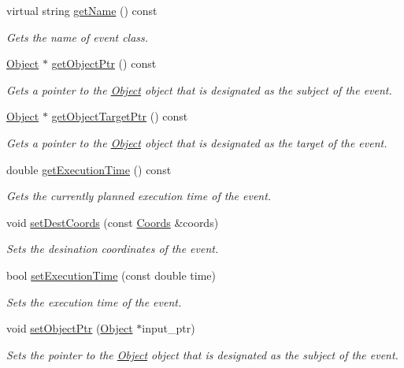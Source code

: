 \begin{DoxyCompactItemize}
virtual string \hyperlink{class_event_a8c38a406d844d05eac1ef007bad2487f}{get\+Name} () const
\begin{DoxyCompactList}\small\item\em Gets the name of event class. \end{DoxyCompactList}\item 
\hyperlink{class_object}{Object} $\ast$ \hyperlink{class_event_a5317d42bb07d0e75bec0c13bd9bf6de8}{get\+Object\+Ptr} () const
\begin{DoxyCompactList}\small\item\em Gets a pointer to the \hyperlink{class_object}{Object} object that is designated as the subject of the event. \end{DoxyCompactList}\item 
\hyperlink{class_object}{Object} $\ast$ \hyperlink{class_event_ab86f724c3c894faa1d6ccca78c357d24}{get\+Object\+Target\+Ptr} () const
\begin{DoxyCompactList}\small\item\em Gets a pointer to the \hyperlink{class_object}{Object} object that is designated as the target of the event. \end{DoxyCompactList}\item 
double \hyperlink{class_event_a65550d982cdf85d993658cd7070c960c}{get\+Execution\+Time} () const
\begin{DoxyCompactList}\small\item\em Gets the currently planned execution time of the event. \end{DoxyCompactList}\item 
void \hyperlink{class_event_a166ae40f2bf26c1e08097697ca76c884}{set\+Dest\+Coords} (const \hyperlink{struct_coords}{Coords} \&coords)
\begin{DoxyCompactList}\small\item\em Sets the desination coordinates of the event. \end{DoxyCompactList}\item 
bool \hyperlink{class_event_af4282af20bd5b3940ba75c23e6032f18}{set\+Execution\+Time} (const double time)
\begin{DoxyCompactList}\small\item\em Sets the execution time of the event. \end{DoxyCompactList}\item 
void \hyperlink{class_event_a078cadde679fc042486ef065a097c7af}{set\+Object\+Ptr} (\hyperlink{class_object}{Object} $\ast$input\+\_\+ptr)
\begin{DoxyCompactList}\small\item\em Sets the pointer to the \hyperlink{class_object}{Object} object that is designated as the subject of the event. \end{DoxyCompactList}\item 

\end{DoxyCompactItemize}
